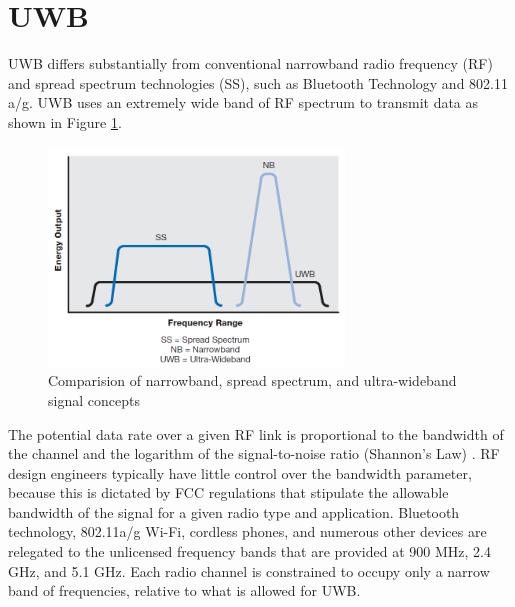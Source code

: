 \section{UWB}
UWB differs substantially from conventional narrowband radio frequency (RF) and spread spectrum technologies (SS), such as Bluetooth Technology and 802.11 a/g. UWB uses an extremely wide band of RF spectrum to transmit data as shown in Figure \ref{fig:Comparision of narrowband, spread spectrum, and ultra-wideband signal concepts}.

\begin{figure}[h!]
    \includegraphics[width=0.7\textwidth]{figures/UWBcomparedtoNB.png}
    \centering
    \caption[Comparision of narrowband, spread spectrum, and ultra-wideband signal concepts]{Comparision of narrowband, spread spectrum, and ultra-wideband signal concepts   \protect \cite{IntelUWB}}
 
    
    \label{fig:Comparision of narrowband, spread spectrum, and ultra-wideband signal concepts}    
\end{figure}

The potential data rate over a given RF link is proportional to the bandwidth of the channel and the logarithm of the signal-to-noise ratio (Shannon’s Law) \cite{haykin2008communication}. RF design engineers typically have little control over the bandwidth parameter, because this is dictated by FCC regulations that stipulate the allowable bandwidth of the signal for a given radio type and application. Bluetooth technology, 802.11a/g Wi-Fi, cordless phones, and numerous other devices are relegated to the unlicensed frequency bands that are provided at 900 MHz, 2.4 GHz, and 5.1 GHz. Each radio channel is constrained to occupy only a narrow band of frequencies, relative to what is allowed for UWB.

